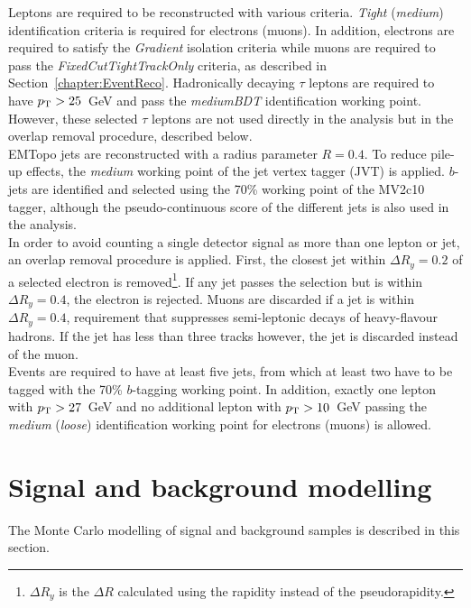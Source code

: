 Leptons are required to be reconstructed with various criteria. \textit{Tight} (\textit{medium}) identification criteria is required for electrons (muons). In addition, electrons are required to satisfy the \textit{Gradient} isolation criteria while muons are required to pass the \textit{FixedCutTightTrackOnly} criteria, as described in Section~\ref{chapter:EventReco}. Hadronically decaying $\tau$ leptons are required to have $p_{\text{T}}>25$~GeV and pass the \textit{mediumBDT} identification working point. However, these selected $\tau$ leptons are not used directly in the analysis but in the overlap removal procedure, described below.\\

EMTopo jets are reconstructed with a radius parameter $R=0.4$. To reduce pile-up effects, the \textit{medium} working point of the jet vertex tagger (JVT) is applied. 
$b$-jets are identified and selected using the 70\% working point of the MV2c10 tagger, although the pseudo-continuous score of the different jets is also used in the analysis.\\

In order to avoid counting a single detector signal as more than one lepton or jet, an overlap removal procedure is applied. First, the closest jet within $\Delta R_y=0.2$ of a selected electron is removed\footnote{$\Delta R_y$ is the $\Delta R$ calculated using the rapidity instead of the pseudorapidity.}. If any jet passes the selection but is within $\Delta R_y=0.4$, the electron is rejected. Muons are discarded if a jet is within $\Delta R_y=0.4$, requirement that suppresses semi-leptonic decays of heavy-flavour hadrons. If the jet has less than three tracks however, the jet is discarded instead of the muon.\\

Events are required to have at least five jets, from which at least two have to be tagged with the 70\% $b$-tagging working point. In addition, exactly one lepton with $p_{\text{T}}>27$~GeV and no additional lepton with $p_{\text{T}}>10$~GeV passing the \textit{medium} (\textit{loose}) identification working point for electrons (muons) is allowed.

\section{Signal and background modelling}
\label{Hplustb:Sectionmodelling}
The Monte Carlo modelling of signal and background samples is described in this section.\\


